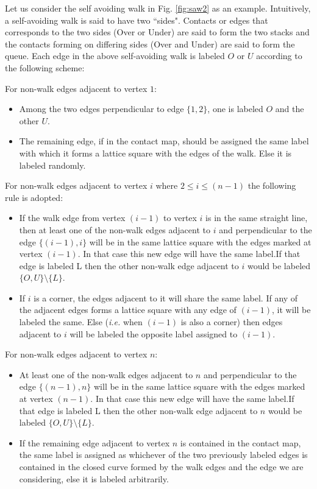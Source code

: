 Let us consider the self avoiding walk in Fig. \ref{fig:saw2} as an example. Intuitively, a self-avoiding walk is said to have two ``sides". Contacts or edges that corresponds to the two sides (Over or Under) are said to form the two stacks and the contacts forming on differing sides (Over and Under) are said to form the queue. Each edge in the above self-avoiding walk is labeled $O$ or $U$ according to the following scheme:
\begin{noindlist}
  \item For non-walk edges adjacent to vertex $1$:
\begin{itemize}
  \item Among the two edges perpendicular to edge $\{1,2\}$, one is labeled $O$ and the other $U$.
  \item The remaining edge, if in the contact map, should be assigned the same label with which it forms a lattice square with the edges of the walk. Else it is labeled randomly.
\end{itemize}
  \item For non-walk edges adjacent to vertex $i$ where $2 \leq i \leq (n-1)$ the following rule is adopted:
	\begin{itemize}
  	  \item If the walk edge from vertex $(i-1)$ to vertex $i$ is in the same straight line, then at least one of the non-walk edges adjacent to $i$ and perpendicular to the edge $\{(i-1),i\}$ will be in the same lattice square with the edges marked at vertex $(i-1)$. In that case this new edge will have the same label.If that edge is labeled L then the other non-walk edge adjacent to $i$ would be labeled $\{O,U\}\setminus \{L\}$.
 	  \item If $i$ is a corner, the edges adjacent to it will share the same label. If any of the adjacent edges forms a lattice square with any edge of $(i-1)$, it will be labeled the same. Else (\emph{i.e.} when $(i-1)$ is also a corner) then edges adjacent to $i$ will be labeled the opposite label assigned to $(i-1)$.
	\end{itemize}
  \item For non-walk edges adjacent to vertex $n$:
\begin{itemize}
  	  \item   At least one of the non-walk edges adjacent to $n$ and perpendicular to the edge $\{(n-1),n\}$ will be in the same lattice square with the edges marked at vertex $(n-1)$. In that case this new edge will have the same label.If that edge is labeled L then the other non-walk edge adjacent to $n$ would be labeled $\{O,U\}\setminus \{L\}$.
 	  \item If the remaining edge adjacent to vertex $n$ is contained in the contact map, the same label is assigned as whichever of the two previously labeled edges is contained in the closed curve formed by the walk edges and the edge we are considering, else it is labeled arbitrarily.
	\end{itemize}
\end{noindlist}
